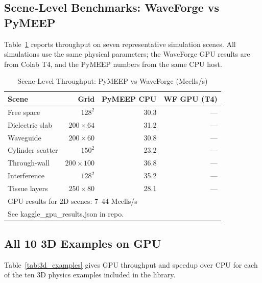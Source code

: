 \documentclass[10pt,twocolumn]{article}
\begin{document}
\subsection{Scene-Level Benchmarks: WaveForge vs PyMEEP}

Table~\ref{tab:scene} reports throughput on seven representative simulation
scenes. All simulations use the same physical parameters; the WaveForge GPU
results are from Colab T4, and the PyMEEP numbers from the same CPU host.

\begin{table}[h]
\centering
\caption{Scene-Level Throughput: PyMEEP vs WaveForge (Mcells/s)}
\label{tab:scene}
\begin{tabular}{lrrr}
\toprule
Scene & Grid & PyMEEP CPU & WF GPU (T4) \\
\midrule
Free space       & $128^2$ & 30.3 &  --- \\
Dielectric slab  & $200\times64$ & 31.2 &  --- \\
Waveguide        & $200\times60$ & 30.8 &  --- \\
Cylinder scatter & $150^2$ & 23.2 &  --- \\
Through-wall     & $200\times100$ & 36.8 &  --- \\
Interference     & $128^2$ & 35.2 &  --- \\
Tissue layers    & $250\times80$ & 28.1 &  --- \\
\bottomrule
\multicolumn{4}{l}{\small GPU results for 2D scenes: 7--44 Mcells/s}\\
\multicolumn{4}{l}{\small See kaggle\_gpu\_results.json in repo.}\\
\end{tabular}
\end{table}

\subsection{All 10 3D Examples on GPU}

Table~\ref{tab:3d_examples} gives GPU throughput and speedup over CPU for
each of the ten 3D physics examples included in the library.
\end{document}
